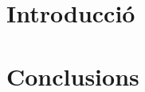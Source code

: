 \section{Introducció}\label{sec:intro}
\lipsum[1-3]

\section{Conclusions}\label{sec:conslusion}
\lipsum[5-6]
